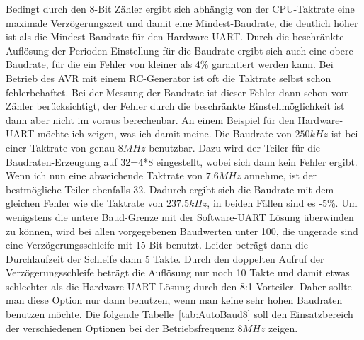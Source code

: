 Bedingt durch den 8-Bit Zähler ergibt sich abhängig von der CPU-Taktrate
eine maximale Verzögerungszeit und damit eine Mindest-Baudrate, die
deutlich höher ist als die Mindest-Baudrate für den Hardware-UART.
Durch die beschränkte Auflösung der Perioden-Einstellung für
die Baudrate ergibt sich auch eine obere Baudrate, für die ein Fehler von 
kleiner als 4\% garantiert werden kann.
Bei Betrieb des AVR mit einem RC-Generator ist oft die Taktrate selbst schon
fehlerbehaftet. Bei der Messung der Baudrate ist dieser Fehler dann
schon vom Zähler berücksichtigt, der Fehler durch die beschränkte Einstellmöglichkeit
ist dann aber nicht im voraus berechenbar.
An einem Beispiel für den Hardware-UART  möchte ich zeigen, was ich damit meine.
Die Baudrate von \(250kHz\) ist bei einer Taktrate von genau \(8MHz\) benutzbar.
Dazu wird der Teiler für die Baudraten-Erzeugung auf 32=4*8 eingestellt, wobei sich 
dann kein Fehler ergibt.
Wenn ich nun eine abweichende Taktrate von \(7.6MHz\) annehme, ist
der bestmögliche Teiler ebenfalls 32. Dadurch ergibt sich die Baudrate mit
dem gleichen Fehler wie die Taktrate von \(237.5kHz\), in beiden Fällen sind es -5\%.
Um wenigstens die untere Baud-Grenze mit der Software-UART Lösung überwinden
zu können, wird bei allen vorgegebenen Baudwerten unter 100, die ungerade sind
eine Verzögerungsschleife mit 15-Bit benutzt. Leider beträgt dann die Durchlaufzeit
der Schleife dann 5 Takte. Durch den doppelten Aufruf der Verzögerungsschleife beträgt
die Auflösung nur noch 10 Takte und damit etwas schlechter als die Hardware-UART
Lösung durch den 8:1 Vorteiler.
Daher sollte man diese Option nur dann benutzen, wenn man keine sehr hohen Baudraten benutzen möchte.
Die folgende Tabelle~\ref{tab:AutoBaud8} soll den Einsatzbereich der verschiedenen Optionen
bei der Betriebsfrequenz \(8MHz\) zeigen.

